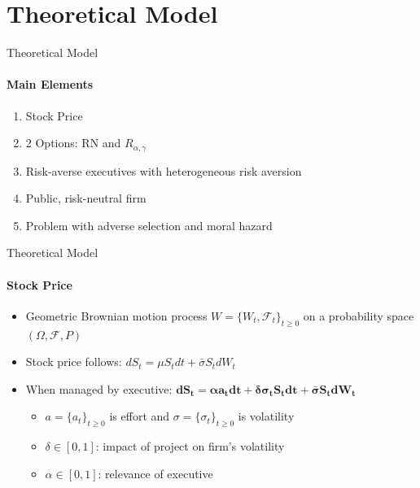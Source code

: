 \documentclass[compress]{beamer}
\begin{document}
\section{Theoretical Model}
\begin{frame}{Theoretical Model}
    \framesubtitle{Main Elements}
    \begin{enumerate}
        \item Stock Price
        \item 2 Options: RN and $R_{\alpha, \gamma}$
        \item Risk-averse executives with heterogeneous risk aversion
        \item Public, risk-neutral firm
        \item Problem with adverse selection and moral hazard
    \end{enumerate}
\end{frame}

\begin{frame}{Theoretical Model}
    \framesubtitle{Stock Price}
    \begin{itemize}
        \item Geometric Brownian motion process $W = \{ W_t, \mathscr{F}_t \}_{t \ge 0}$ on a probability space $(\Omega, \mathscr{F}, P)$
        \vspace*{5pt}
        \item Stock price follows: $dS_t = \mu S_t dt + \bar{\sigma} S_t dW_t$
        \vspace*{5pt}
        \pause
        \item When managed by executive: $\boldsymbol{dS_t = \alpha a_t dt + \delta \sigma_t S_t dt + \bar{\sigma} S_t dW_t}$
        \begin{itemize}
            \item $a = \{a_t\}_{t \ge 0}$ is effort and $\sigma = \{\sigma_t\}_{t \ge 0}$ is volatility
            \item $\delta \in [0,1]$: impact of project on firm's volatility
            \item $\alpha \in [0,1]$: relevance of executive
        \end{itemize}
    \end{itemize}
\end{frame}
\end{document}

